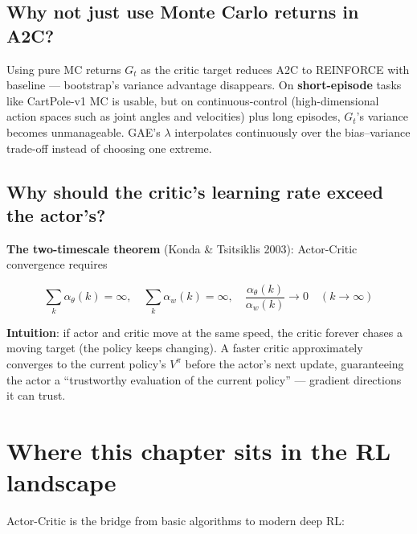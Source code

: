 \documentclass{article}
\begin{document}
\subsection*{Why not just use Monte Carlo returns in A2C?}

Using pure MC returns $G_t$ as the critic target reduces A2C to REINFORCE with baseline --- bootstrap's variance advantage disappears. On \textbf{short-episode} tasks like CartPole-v1 MC is usable, but on continuous-control (high-dimensional action spaces such as joint angles and velocities) plus long episodes, $G_t$'s variance becomes unmanageable. GAE's $\lambda$ interpolates continuously over the bias--variance trade-off instead of choosing one extreme.

\subsection*{Why should the critic's learning rate exceed the actor's?}

\textbf{The two-timescale theorem} (Konda \& Tsitsiklis 2003): Actor-Critic convergence requires

\[
\sum_k \alpha_\theta(k) = \infty, \quad \sum_k \alpha_w(k) = \infty, \quad
\frac{\alpha_\theta(k)}{\alpha_w(k)} \to 0 \quad (k \to \infty)
\]

\textbf{Intuition}: if actor and critic move at the same speed, the critic forever chases a moving target (the policy keeps changing). A faster critic approximately converges to the current policy's $V^\pi$ before the actor's next update, guaranteeing the actor a ``trustworthy evaluation of the current policy'' --- gradient directions it can trust.

\section*{Where this chapter sits in the RL landscape}

Actor-Critic is the bridge from basic algorithms to modern deep RL:
\end{document}
